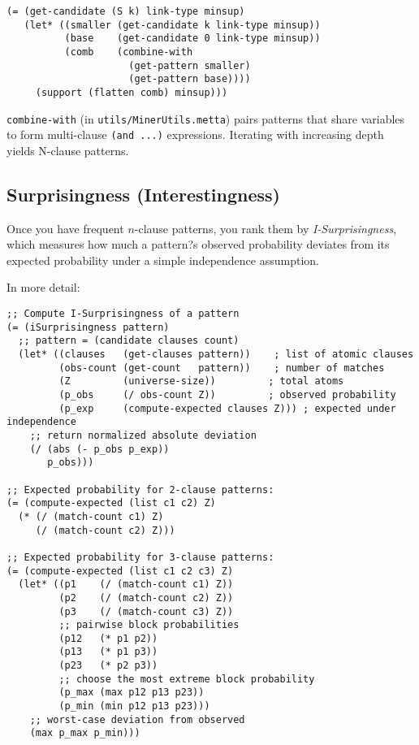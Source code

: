 \begin{verbatim}
(= (get-candidate (S k) link-type minsup)
   (let* ((smaller (get-candidate k link-type minsup))
          (base    (get-candidate 0 link-type minsup))
          (comb    (combine-with
                     (get-pattern smaller)
                     (get-pattern base))))
     (support (flatten comb) minsup)))
\end{verbatim}

\texttt{combine-with} (in \texttt{utils/MinerUtils.metta}) pairs patterns that share variables to form multi-clause \verb|(and ...)| expressions.  Iterating with increasing depth yields N-clause patterns.

\subsection{Surprisingness (Interestingness)}

Once you have frequent $n$-clause patterns, you rank them by \emph{I-Surprisingness}, which measures how much a pattern?s observed probability deviates from its expected probability under a simple independence assumption.  

In more detail:

\begin{verbatim}
;; Compute I-Surprisingness of a pattern
(= (iSurprisingness pattern)
  ;; pattern = (candidate clauses count)
  (let* ((clauses   (get-clauses pattern))    ; list of atomic clauses
         (obs-count (get-count   pattern))    ; number of matches
         (Z         (universe-size))         ; total atoms
         (p_obs     (/ obs-count Z))         ; observed probability
         (p_exp     (compute-expected clauses Z))) ; expected under independence
    ;; return normalized absolute deviation
    (/ (abs (- p_obs p_exp))
       p_obs)))

;; Expected probability for 2-clause patterns:
(= (compute-expected (list c1 c2) Z)
  (* (/ (match-count c1) Z)
     (/ (match-count c2) Z)))

;; Expected probability for 3-clause patterns:
(= (compute-expected (list c1 c2 c3) Z)
  (let* ((p1    (/ (match-count c1) Z))
         (p2    (/ (match-count c2) Z))
         (p3    (/ (match-count c3) Z))
         ;; pairwise block probabilities
         (p12   (* p1 p2))
         (p13   (* p1 p3))
         (p23   (* p2 p3))
         ;; choose the most extreme block probability
         (p_max (max p12 p13 p23))
         (p_min (min p12 p13 p23)))
    ;; worst-case deviation from observed
    (max p_max p_min)))
\end{verbatim}


